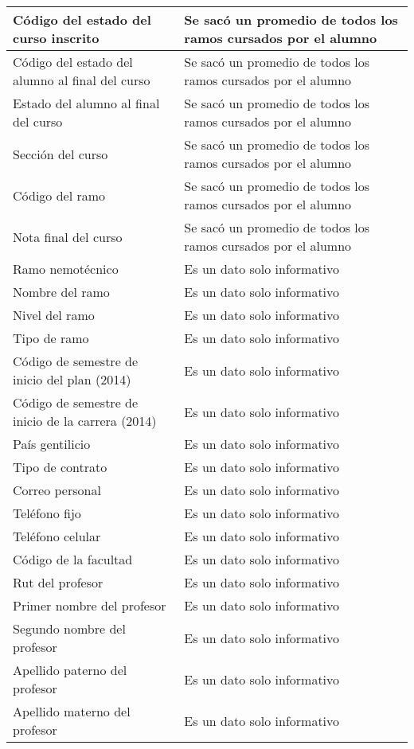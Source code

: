 \begin{longtable}{| p{5cm}| p{7cm} |}
Código del estado del curso inscrito & Se sacó un promedio de todos los ramos cursados por el alumno	\\ \hline
Código del estado del alumno al final del curso & Se sacó un promedio de todos los ramos cursados por el alumno	\\ \hline
Estado del alumno al final del curso & Se sacó un promedio de todos los ramos cursados por el alumno	\\ \hline
Sección del curso & Se sacó un promedio de todos los ramos cursados por el alumno	\\ \hline
Código del ramo & Se sacó un promedio de todos los ramos cursados por el alumno	\\ \hline
Nota final del curso & Se sacó un promedio de todos los ramos cursados por el alumno	\\ \hline
Ramo nemotécnico & Es un dato solo informativo 	\\ \hline
Nombre del ramo & Es un dato solo informativo	\\ \hline
Nivel del ramo & Es un dato solo informativo	\\ \hline
Tipo de ramo & Es un dato solo informativo	\\ \hline
Código de semestre de inicio del plan (2014) & Es un dato solo informativo	\\ \hline
Código de semestre de inicio de la carrera (2014) & Es un dato solo informativo	\\ \hline
País gentilicio & Es un dato solo informativo	\\ \hline
Tipo de contrato & Es un dato solo informativo	\\ \hline
Correo personal & Es un dato solo informativo	\\ \hline
Teléfono fijo & Es un dato solo informativo	\\ \hline
Teléfono celular & Es un dato solo informativo	\\ \hline
Código de la facultad & Es un dato solo informativo	\\ \hline
Rut del profesor & 	Es un dato solo informativo\\ \hline
Primer nombre del profesor & Es un dato solo informativo	\\ \hline
Segundo nombre del profesor & Es un dato solo informativo	\\ \hline
Apellido paterno del profesor & Es un dato solo informativo	\\ \hline
Apellido materno del profesor & Es un dato solo informativo	\\ \hline

\end{longtable}
